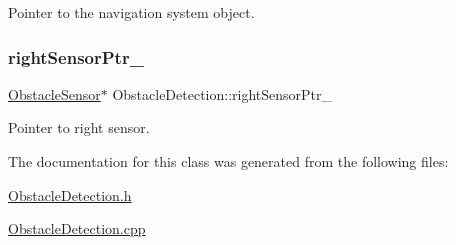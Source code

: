 Pointer to the navigation system object. 

\mbox{\label{class_obstacle_detection_a25b7aed86ead63e6f71154855cc2d42c}} 
\subsubsection{\texorpdfstring{right\+Sensor\+Ptr\+\_\+}{rightSensorPtr\_}}
{\footnotesize\ttfamily \mbox{\hyperlink{class_obstacle_sensor}{Obstacle\+Sensor}}$\ast$ Obstacle\+Detection\+::right\+Sensor\+Ptr\+\_\+\hspace{0.3cm}{\ttfamily [private]}}



Pointer to right sensor. 



The documentation for this class was generated from the following files\+:\begin{DoxyCompactItemize}
\item 
\mbox{\hyperlink{_obstacle_detection_8h}{Obstacle\+Detection.\+h}}\item 
\mbox{\hyperlink{_obstacle_detection_8cpp}{Obstacle\+Detection.\+cpp}}\end{DoxyCompactItemize}
